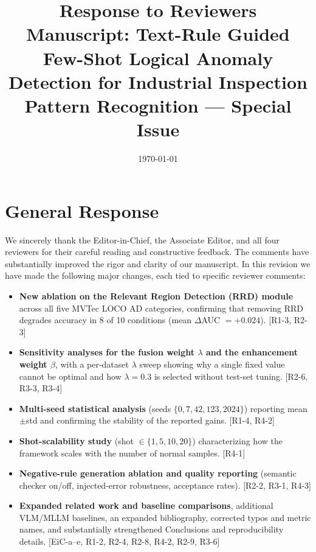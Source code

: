 \documentclass{article}
\begin{document}
\title{Response to Reviewers\\
\large Manuscript: Text-Rule Guided Few-Shot Logical Anomaly Detection for Industrial Inspection\\
\large Pattern Recognition --- Special Issue}
\date{\today}
\maketitle

\section*{General Response}

We sincerely thank the Editor-in-Chief, the Associate Editor, and all four reviewers for their
careful reading and constructive feedback. The comments have substantially improved the rigor and
clarity of our manuscript. In this revision we have made the following major changes, each tied to
specific reviewer comments:

\begin{itemize}
  \item \textbf{New ablation on the Relevant Region Detection (RRD) module} across all five MVTec
        LOCO AD categories, confirming that removing RRD degrades accuracy in 8 of 10 conditions
        (mean $\Delta$AUC $=+0.024$). [R1-3, R2-3]
  \item \textbf{Sensitivity analyses for the fusion weight $\lambda$ and the enhancement weight
        $\beta$}, with a per-dataset $\lambda$ sweep showing why a single fixed value cannot be
        optimal and how $\lambda=0.3$ is selected without test-set tuning. [R2-6, R3-3, R3-4]
  \item \textbf{Multi-seed statistical analysis} (seeds $\{0,7,42,123,2024\}$) reporting mean$\pm$std
        and confirming the stability of the reported gains. [R1-4, R4-2]
  \item \textbf{Shot-scalability study} (shot $\in\{1,5,10,20\}$) characterizing how the framework
        scales with the number of normal samples. [R4-1]
  \item \textbf{Negative-rule generation ablation and quality reporting} (semantic checker on/off,
        injected-error robustness, acceptance rates). [R2-2, R3-1, R4-3]
  \item \textbf{Expanded related work and baseline comparisons}, additional VLM/MLLM baselines, an
        expanded bibliography, corrected typos and metric names, and substantially strengthened
        Conclusions and reproducibility details. [EiC-a--e, R1-2, R2-4, R2-8, R4-2, R2-9, R3-6]
\end{itemize}
\end{document}
